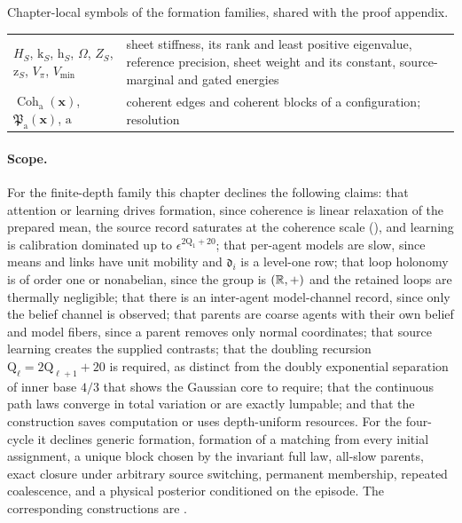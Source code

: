 \begin{sciencetable}{Chapter-local symbols of the formation families, shared with the proof appendix.}
\begin{tabularx}{\textwidth}{>{\raggedright\arraybackslash}p{}>{\raggedright\arraybackslash}X}
\(H_S\), \(\mathrm k_S\), \(\mathrm h_S\), \(\Omega\), \(Z_S\), \(\mathrm z_S\), \(V_\pi\), \(V_{\min}\) & sheet stiffness, its rank and least positive eigenvalue, reference precision, sheet weight and its constant, source-marginal and gated energies \\
\(\operatorname{Coh}_{\mathrm a}(\mathbf x)\), \(\mathfrak P_{\mathrm a}(\mathbf x)\), \(\mathrm a\) & coherent edges and coherent blocks of a configuration; resolution \\
\bottomrule
\end{tabularx}
\end{sciencetable}

\paragraph{Scope.}
For the finite-depth family this chapter declines the following claims: that
attention or learning drives formation, since coherence is linear relaxation
of the prepared mean, the source record saturates at the coherence scale
(), and learning is calibration dominated up
to \(\epsilon^{2\mathrm Q_1+20}\); that per-agent models are slow, since means
and links have unit mobility and \(\mathfrak d_i\) is a level-one row; that
loop holonomy is of order one or nonabelian, since the group is \((\mathbb R,+)\) and
the retained loops are thermally negligible; that there is an inter-agent
model-channel record, since only the belief channel is observed; that parents
are coarse agents with their own belief and model fibers, since a parent
removes only normal coordinates; that source learning creates the supplied
contrasts; that the doubling recursion \(\mathrm Q_\ell=2\mathrm Q_{\ell+1}+20\)
is required, as distinct from the doubly exponential separation of inner base
\(4/3\) that  shows the Gaussian core to
require; that the continuous path laws converge in total variation or are exactly lumpable; and
that the construction saves computation or uses depth-uniform resources. For
the four-cycle it declines generic formation, formation of a matching from
every initial assignment, a unique block chosen by the invariant full law,
all-slow parents, exact closure under arbitrary source switching, permanent
membership, repeated coalescence, and a physical posterior conditioned on the
episode. The corresponding constructions are
.

